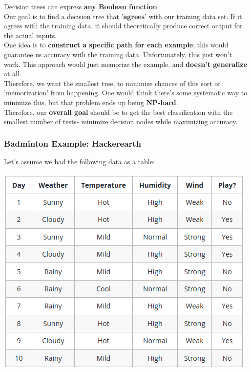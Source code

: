 \documentclass[english, 10pt]{article}
\begin{document}
Decision trees can express \textbf{any Boolean function}.\\

Our goal is to find a decision tree that '\textbf{agrees}' with our training data set. If it agrees with the training data, it should theoretically produce correct output for the actual inputs.\\

One idea is to \textbf{construct a specific path for each example}; this would guarantee us accuracy with the training data. Unfortunately, this just won't work. This approach would just memorize the example, and \textbf{doesn't generalize} at all.\\

Therefore, we want the smallest tree, to minimize chances of this sort of 'memorization' from happening. One would think there's some systematic way to minimize this, but that problem ends up being \textbf{NP-hard}.\\

Therefore, our \textbf{overall goal} should be to get the best classification with the smallest number of tests- minimize decision nodes while maximizing accuracy.\\

\subsubsection{Badminton Example: Hackerearth}

Let's assume we had the following data as a table:

\begin{center}
	\includegraphics[scale=0.8]{img/table.png} 
\end{center}
\end{document}
